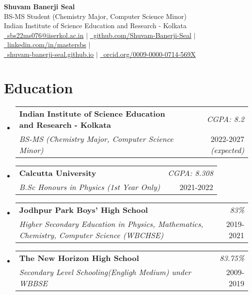 \documentclass[a4paper,9pt]{article}
\makeatletter
\newcommand{\resumeSubheading}[4]{
    \item\small{
        \begin{tabular*}{0.97\textwidth}[t]{l@{\extracolsep{\fill}}r}
            \textbf{#1} & \textit{#2} \\
            \textit{#3} & \small{#4}
        \end{tabular*}
    }\vspace{3pt}
}
\newcommand{\compactSection}[2]{
    \section{#1}
    \vspace{-0.1cm}
    #2
    \vspace{-0.2cm}
}
\makeatother
\begin{document}
\selectfont

\begin{center}
    \textbf{\Large Shuvam Banerji Seal}\\[0.3em]
    \small{
        BS-MS Student (Chemistry Major, Computer Science Minor)  \\[0.2em]
        Indian Institute of Science Education and Research - Kolkata\\[0.2em]
        \href{mailto:sbs22ms076@iiserkol.ac.in}{\faEnvelope\ sbs22ms076@iiserkol.ac.in} $\mid$
        \href{https://github.com/Shuvam-Banerji-Seal}{\faGithub\ github.com/Shuvam-Banerji-Seal} $\mid$
        \href{https://www.linkedin.com/in/mastersbs}{\faLinkedin\ linkedin.com/in/mastersbs} $\mid$ \\
        \href{https://shuvam-banerji-seal.github.io}{\faGlobe\ shuvam-banerji-seal.github.io} $\mid$
        \href{https://orcid.org/0009-0000-0714-569X}{\faOrcid\ orcid.org/0009-0000-0714-569X} 
    }
\end{center}

\compactSection{Education}{
\begin{itemize}[leftmargin=*,label={},itemsep=3pt]
    \resumeSubheading{Indian Institute of Science Education and Research - Kolkata}{CGPA: 8.2}
    {BS-MS (Chemistry Major, Computer Science Minor)}{2022-2027 \textit{(expected)}}
    \vspace{-5pt}
    \resumeSubheading{Calcutta University}{CGPA: 8.308}
    {B.Sc Honours in Physics (1st Year Only)}{2021-2022}
        \vspace{-5pt}
    \resumeSubheading{Jodhpur Park Boys' High School}{83\%}
    {Higher Secondary Education in Physics, Mathematics, Chemistry, Computer Science (WBCHSE)}{2019-2021}
        \vspace{-5pt}
    \resumeSubheading{The New Horizon High School}{83.75\%}
      {Secondary Level Schooling(Engligh Medium) under WBBSE}{2009-2019}
\end{itemize}
}
\end{document}
